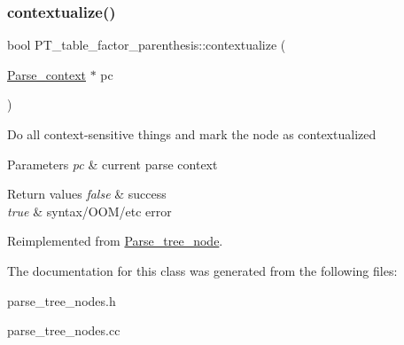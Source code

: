 \subsubsection{\texorpdfstring{contextualize()}{contextualize()}}
{\footnotesize\ttfamily bool P\+T\+\_\+table\+\_\+factor\+\_\+parenthesis\+::contextualize (\begin{DoxyParamCaption}\item[{\mbox{\hyperlink{structParse__context}{Parse\+\_\+context}} $\ast$}]{pc }\end{DoxyParamCaption})\hspace{0.3cm}{\ttfamily [virtual]}}

Do all context-\/sensitive things and mark the node as contextualized


\begin{DoxyParams}{Parameters}
{\em pc} & current parse context\\
\hline
\end{DoxyParams}

\begin{DoxyRetVals}{Return values}
{\em false} & success \\
\hline
{\em true} & syntax/\+O\+O\+M/etc error \\
\hline
\end{DoxyRetVals}


Reimplemented from \mbox{\hyperlink{classParse__tree__node_a22d93524a537d0df652d7efa144f23da}{Parse\+\_\+tree\+\_\+node}}.



The documentation for this class was generated from the following files\+:\begin{DoxyCompactItemize}
\item 
parse\+\_\+tree\+\_\+nodes.\+h\item 
parse\+\_\+tree\+\_\+nodes.\+cc\end{DoxyCompactItemize}

